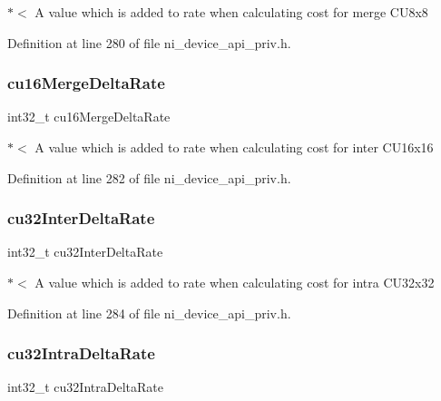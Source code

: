 $\ast$$<$ A value which is added to rate when calculating cost for merge C\+U8x8 

Definition at line 280 of file ni\+\_\+device\+\_\+api\+\_\+priv.\+h.

\mbox{\label{struct__ni__t408__config__t_aa2779a8e49347db08ae257ddfaeab8b4}} 
\subsubsection{\texorpdfstring{cu16MergeDeltaRate}{cu16MergeDeltaRate}}
{\footnotesize\ttfamily int32\+\_\+t cu16\+Merge\+Delta\+Rate}

$\ast$$<$ A value which is added to rate when calculating cost for inter C\+U16x16 

Definition at line 282 of file ni\+\_\+device\+\_\+api\+\_\+priv.\+h.

\mbox{\label{struct__ni__t408__config__t_a73b4b9d53c5098de3166b2ff0b394549}} 
\subsubsection{\texorpdfstring{cu32InterDeltaRate}{cu32InterDeltaRate}}
{\footnotesize\ttfamily int32\+\_\+t cu32\+Inter\+Delta\+Rate}

$\ast$$<$ A value which is added to rate when calculating cost for intra C\+U32x32 

Definition at line 284 of file ni\+\_\+device\+\_\+api\+\_\+priv.\+h.

\mbox{\label{struct__ni__t408__config__t_aecf1c88ecf0954ef453228b26378e054}} 
\subsubsection{\texorpdfstring{cu32IntraDeltaRate}{cu32IntraDeltaRate}}
{\footnotesize\ttfamily int32\+\_\+t cu32\+Intra\+Delta\+Rate}

